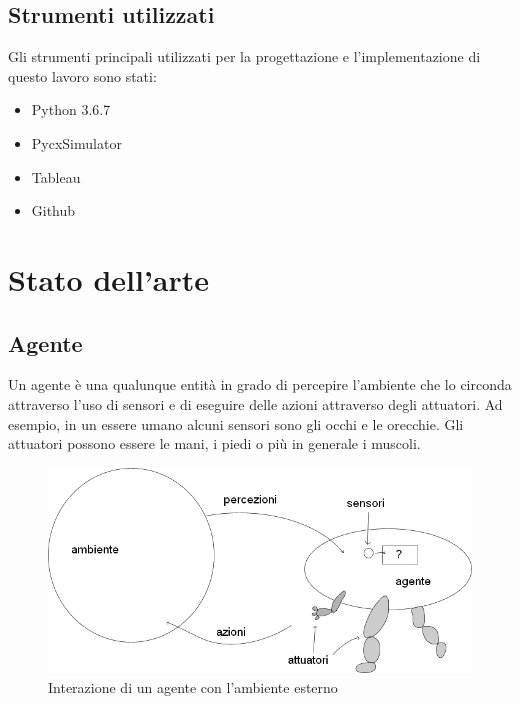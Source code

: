 \documentclass[12pt]{article}
\begin{document}
\subsection{Strumenti utilizzati}
Gli strumenti principali utilizzati per la progettazione e l'implementazione di questo lavoro sono stati:
\begin{itemize}
\item Python 3.6.7 \cite{Python}
\item PycxSimulator \cite{PycxSimulator}
\item Tableau \cite{Tableau} 
\item Github \cite{GitHub}
\end{itemize}

\newpage
\section{Stato dell'arte}

\subsection{Agente}

Un agente è una qualunque entità in grado di percepire l’ambiente che lo circonda attraverso l’uso di sensori e di eseguire delle azioni attraverso degli attuatori. Ad esempio, in un essere umano alcuni sensori sono gli occhi e le orecchie. Gli attuatori possono essere le mani, i piedi o più in generale i muscoli.

\begin{figure}[ht]
\includegraphics[width=\textwidth,height=\textheight,keepaspectratio]{Figures/Vario/Agente.png}
\caption[Interazione di un agente con l'ambiente esterno]{Interazione di un agente con l'ambiente esterno}
\label{fig:Agente}
\end{figure}
\end{document}
